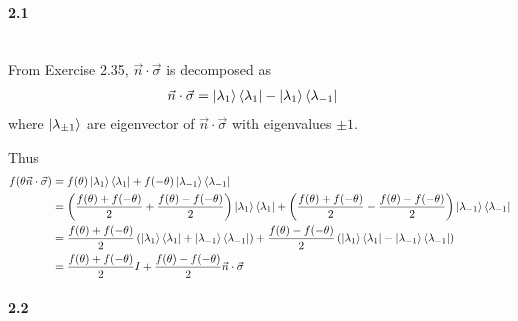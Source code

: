 \paragraph{2.1} \textbf{}%
\\

From Exercise 2.35, $\vec{n} \cdot \vec{\sigma}$ is decomposed as
\begin{align*}
	\vec{n} \cdot \vec{\sigma} &= \ket{\lambda_1}\bra{\lambda_1} - \ket{\lambda_1}\bra{\lambda_{-1}}
\end{align*}
where $\ket{\lambda_{\pm 1}}$ are eigenvector of $\vec{n} \cdot \vec{\sigma}$ with eigenvalues $\pm 1$.

Thus
\begin{align*}
	f(\theta \vec{n} \cdot \vec{\sigma}) &= f(\theta) \ket{\lambda_1}\bra{\lambda_1} + f(- \theta) \ket{\lambda_{-1}}\bra{\lambda_{-1}}\\
		&= \left( \frac{f(\theta) + f(-\theta)}{2} + \frac{f(\theta) - f(-\theta)}{2}  \right) \ket{\lambda_1}\bra{\lambda_1} + \left( \frac{f(\theta) + f(-\theta)}{2} - \frac{f(\theta) - f(-\theta)}{2}  \right)\ket{\lambda_{-1}}\bra{\lambda_{-1}}\\
		&= \frac{f(\theta) + f(-\theta)}{2} \left( \ket{\lambda_1}\bra{\lambda_1}+ \ket{\lambda_{-1}}\bra{\lambda_{-1}} \right) +  \frac{f(\theta) - f(-\theta)}{2} \left(\ket{\lambda_1}\bra{\lambda_1} - \ket{\lambda_{-1}}\bra{\lambda_{-1}} \right)\\
		&= \frac{f(\theta) + f(-\theta)}{2} I + \frac{f(\theta) - f(-\theta)}{2} \vec{n} \cdot \vec{\sigma}
\end{align*}


\paragraph{2.2} \textbf{}%
\\

